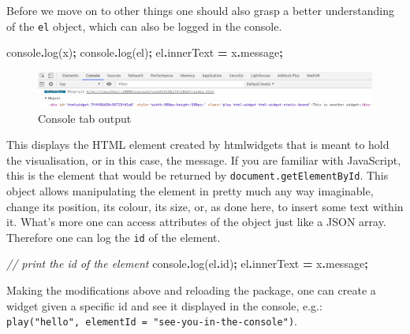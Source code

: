 \documentclass[
]{krantz}
\makeatletter
\newenvironment{Shaded}{\begin{snugshade}}{\end{snugshade}}
\newcommand{\AttributeTok}[1]{\textcolor[rgb]{0.61,0.61,0.61}{#1}}
\newcommand{\BuiltInTok}[1]{#1}
\newcommand{\CommentTok}[1]{\textcolor[rgb]{0.37,0.37,0.37}{\textit{#1}}}
\newcommand{\FunctionTok}[1]{\textcolor[rgb]{0,0,0}{#1}}
\newcommand{\NormalTok}[1]{#1}
\newcommand{\OperatorTok}[1]{\textcolor[rgb]{0.43,0.43,0.43}{\textbf{#1}}}
\newenvironment{kframe}{%
\medskip{}
\setlength{\fboxsep}{.8em}
 \def\at@end@of@kframe{}%
 \ifinner\ifhmode%
  \def\at@end@of@kframe{\end{minipage}}%
  \begin{minipage}{\columnwidth}%
 \fi\fi%
 \def\FrameCommand##1{\hskip\@totalleftmargin \hskip-\fboxsep
 \colorbox{shadecolor}{##1}\hskip-\fboxsep
     \hskip-\linewidth \hskip-\@totalleftmargin \hskip\columnwidth}%
 \MakeFramed {\advance\hsize-\width
   \@totalleftmargin\z@ \linewidth\hsize
   \@setminipage}}%
 {\par\unskip\endMakeFramed%
 \at@end@of@kframe}
\renewenvironment{Shaded}{\begin{kframe}}{\end{kframe}}
\makeatother
\begin{document}
Before we move on to other things one should also grasp a better understanding of the \texttt{el} object, which can also be logged in the console.

\begin{Shaded}
\begin{Highlighting}[]
\BuiltInTok{console}\OperatorTok{.}\FunctionTok{log}\NormalTok{(x)}\OperatorTok{;}
\BuiltInTok{console}\OperatorTok{.}\FunctionTok{log}\NormalTok{(el)}\OperatorTok{;}
\NormalTok{el}\OperatorTok{.}\AttributeTok{innerText} \OperatorTok{=}\NormalTok{ x}\OperatorTok{.}\AttributeTok{message}\OperatorTok{;}
\end{Highlighting}
\end{Shaded}

\begin{figure}
\centering
\includegraphics{images/playground-console-el.png}
\caption{Console tab output}
\end{figure}

This displays the HTML element created by htmlwidgets that is meant to hold the visualisation, or in this case, the message. If you are familiar with JavaScript, this is the element that would be returned by \texttt{document.getElementById}. This object allows manipulating the element in pretty much any way imaginable, change its position, its colour, its size, or, as done here, to insert some text within it. What's more one can access attributes of the object just like a JSON array. Therefore one can log the \texttt{id} of the element.

\begin{Shaded}
\begin{Highlighting}[]
\CommentTok{// print the id of the element}
\BuiltInTok{console}\OperatorTok{.}\FunctionTok{log}\NormalTok{(el}\OperatorTok{.}\AttributeTok{id}\NormalTok{)}\OperatorTok{;}
\NormalTok{el}\OperatorTok{.}\AttributeTok{innerText} \OperatorTok{=}\NormalTok{ x}\OperatorTok{.}\AttributeTok{message}\OperatorTok{;}
\end{Highlighting}
\end{Shaded}

Making the modifications above and reloading the package, one can create a widget given a specific id and see it displayed in the console, e.g.: \texttt{play("hello",\ elementId\ =\ "see-you-in-the-console")}.
\end{document}
